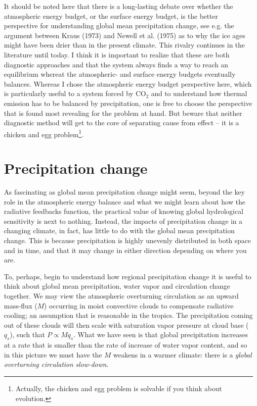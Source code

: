 \documentclass[12pt]{book}
\begin{document}
\noindent It should be noted here that there is a long-lasting debate over whether the atmospheric energy budget, or the surface energy budget, is the better perspective for understanding global mean precipitation change, see e.g. the argument between Kraus (1973) and Newell et al. (1975) as to why the ice ages might have been drier than in the present climate. This rivalry continues in the literature until today. I think it is important to realize that these are both diagnostic approaches and that the system always finds a way to reach an equilibrium whereat the atmospheric- and surface energy budgets eventually balances. Whereas I chose the atmospheric energy budget perspective here, which is particularly useful to a system forced by CO$_2$ and to understand how thermal emission has to be balanced by precipitation, one is free to choose the perspective that is found most revealing for the problem at hand. But beware that neither diagnostic method will get to the core of separating cause from effect -- it is a chicken and egg problem\footnote{Actually, the chicken and egg problem is solvable if you think about evolution.}. 



\section{Precipitation change}
As fascinating as global mean precipitation change might seem, beyond the key role in the atmospheric energy balance and what we might learn about how the radiative feedbacks function, the practical value of knowing global hydrological sensitivity is next to nothing. Instead, the impacts of precipitation change in a changing climate, in fact, has little to do with the global mean precipitation change. This is because precipitation is highly unevenly distributed in both space and in time, and that it may change in either direction depending on where you are.

To, perhaps, begin to understand how regional precipitation change it is useful to think about global mean precipitation, water vapor and circulation change together. We may view the atmospheric overturning circulation as an upward mass-flux ($M$) occurring in moist convective clouds to compensate radiative cooling; an assumption that is reasonable in the tropics. The precipitation coming out of these clouds will then scale with saturation vapor pressure at cloud base ($q_s$), such that $P \propto Mq_s$. What we have seen is that global precipitation increases at a rate that is smaller than the rate of increase of water vapor content, and so in this picture we must have the $M$ weakens in a warmer climate: there is a {\em global overturning circulation slow-down}.
\end{document}
